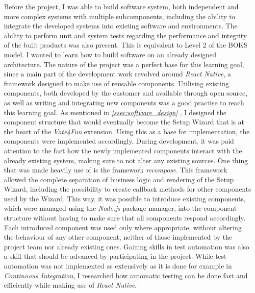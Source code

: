 Before the project, I was able to build software system, both independent and more complex systems with multiple subcomponents, including the ability to integrate the developed systems into existing software and environments. The ability to perform unit and system tests regarding the performance and integrity of the built products was also present. This is equivalent to Level 2 of the BOKS model.
\newline
I wanted to learn how to build software on an already designed architecture. The nature of the project was a perfect base for this learning goal, since a main part of the development work revolved around \textit{React Native}, a framework designed to make use of reusable components. Utilising existing components, both developed by the customer and available through open source, as well as writing and integrating new components was a good practise to reach this learning goal.
\newline
As mentioned in \textit{\ref{ssec:software_design} }, I designed the component structure that would eventually become the Setup Wizard that is at the heart of the \textit{Vote4Fun} extension. Using this as a base for implementation, the components were implemented accordingly. During development, it was paid attention to the fact how the newly implemented components interact with the already existing system, making sure to not alter any existing sources.
\newline
One thing that was made heavily use of is the framework \textit{recompose}. This framework allowed the complete separation of business logic and rendering of the Setup Wizard, including the possibility to create callback methods for other components used by the Wizard. This way, it was possible to introduce existing components, which were managed using the \textit{Node.js} package manager, into the component structure without having to make sure that all components respond accordingly. Each introduced component was used only where appropriate, without altering the behaviour of any other component, neither of those implemented by the project team nor already existing ones.
\newline
Gaining skills in test automation was also a skill that should be advanced by participating in the project. While test automation was not implemented as extensively as it is done for example in \textit{Continuous Integration}, I researched how automatic testing can be done fast and efficiently while making use of \textit{React Native}.
\newline
